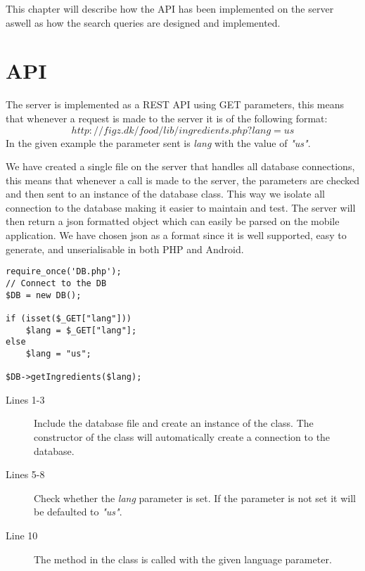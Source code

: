 This chapter will describe how the API has been implemented on the server aswell as how the search queries are designed and implemented.
\section{API}
\label{sec:com}

The server is implemented as a REST API using GET parameters, this means that whenever a request is made to the server it is of the following format: $$http://figz.dk/food/lib/ingredients.php?lang=us$$ In the given example the parameter sent is \textit{lang} with the value of \textit{"us"}.

We have created a single file on the server that handles all database connections, this means that whenever a call is made to the server, the parameters are checked and then sent to an instance of the database class. This way we isolate all connection to the database making it easier to maintain and test. The server will then return a \ac{json} formatted object which can easily be parsed on the mobile application. We have chosen \ac{json} as a format since it is well supported, easy to generate, and unserialisable in both PHP and Android.

\begin{lstlisting}[language=phpstyle, caption=ingredients.php]
require_once('DB.php');
// Connect to the DB
$DB = new DB();

if (isset($_GET["lang"]))
	$lang = $_GET["lang"];
else
	$lang = "us";

$DB->getIngredients($lang);
\end{lstlisting}%

\begin{description}
\item[Lines 1-3] Include the database file and create an instance of the  class. The constructor of the  class will automatically create a connection to the database.
\item[Lines 5-8] Check whether the \textit{lang} parameter is set. If the parameter is not set it will be defaulted to \textit{"us"}.
\item[Line 10] The method  in the  class is called with the given language parameter.
\end{description}

